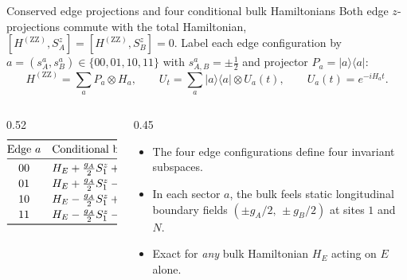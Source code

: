 \documentclass[aspectratio=169,11pt]{beamer}
\newcommand{\ket}[1]{\lvert #1\rangle}
\newcommand{\bra}[1]{\langle #1\rvert}
\newcommand{\ZZ}{\mathrm{ZZ}}
\begin{document}
\begin{frame}{Conserved edge projections and four conditional bulk Hamiltonians}
\small
Both edge $z$-projections commute with the total Hamiltonian, $[H^{(\ZZ)},S_A^z]=[H^{(\ZZ)},S_B^z]=0$.
Label each edge configuration by $a=(s_A^a,s_B^a)\in\{00,01,10,11\}$ with $s_{A,B}^a=\pm\tfrac12$ and projector $P_a=\ket a\bra a$:
\[
H^{(\ZZ)}=\sum_{a}P_a\otimes H_a,\qquad
\boxed{U_t=\sum_{a}\ket a\bra a\otimes U_a(t),\qquad U_a(t)=e^{-iH_at}.}
\]
\begin{columns}[T,totalwidth=\textwidth]
\begin{column}{0.52\textwidth}
\[
\begin{array}{@{}c@{\quad}l@{}}
\toprule
\text{Edge } a & \text{Conditional bulk Hamiltonian } H_a\\\midrule
00 & H_E + \tfrac{g_A}{2}S_1^z + \tfrac{g_B}{2}S_N^z \\[2pt]
01 & H_E + \tfrac{g_A}{2}S_1^z - \tfrac{g_B}{2}S_N^z \\[2pt]
10 & H_E - \tfrac{g_A}{2}S_1^z + \tfrac{g_B}{2}S_N^z \\[2pt]
11 & H_E - \tfrac{g_A}{2}S_1^z - \tfrac{g_B}{2}S_N^z \\\bottomrule
\end{array}
\]
\end{column}
\begin{column}{0.45\textwidth}
\vspace{4pt}
\begin{itemize}\setlength\itemsep{5pt}
\item The four edge configurations define four invariant subspaces.
\item In each sector $a$, the bulk feels static longitudinal boundary fields $(\pm g_A/2,\,\pm g_B/2)$ at sites $1$ and $N$.
\item Exact for \emph{any} bulk Hamiltonian $H_E$ acting on $E$ alone.
\end{itemize}
\end{column}
\end{columns}
\end{frame}
\end{document}
